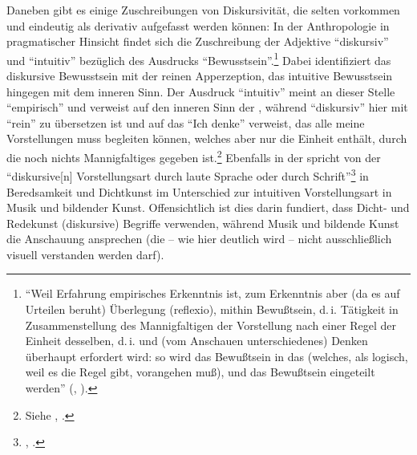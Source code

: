 Daneben gibt es einige Zuschreibungen von Diskursivität, die selten
vorkommen und eindeutig als derivativ aufgefasst werden können: In der
Anthropologie in pragmatischer Hinsicht findet sich die Zuschreibung der
Adjektive \enquote{diskursiv} und \enquote{intuitiv} bezüglich des
Ausdrucks \enquote{Bewusstsein}.\footnote{\enquote{Weil Erfahrung empirisches
Erkenntnis ist, zum Erkenntnis aber (da es auf Urteilen beruht) Überlegung
(reflexio), mithin Bewußtsein, d.\,i. Tätigkeit in Zusammenstellung des
Mannigfaltigen der Vorstellung nach einer Regel der Einheit desselben, d.\,i.
 und (vom Anschauen unterschiedenes) Denken überhaupt erfordert
wird: so wird das Bewußtsein in das  (welches, als logisch, weil
es die Regel gibt, vorangehen muß), und das  Bewußtsein
eingeteilt werden} \mkbibparens{\cite[][BA
27]{Kant:AnthropologieinpragmatischerHinsicht1977}, \cite[][VII:
141.21--27]{Kant:GesammelteWerke1900ff.}}.} Dabei identifiziert
 das diskursive Bewusstsein mit der reinen Apperzeption,
das intuitive Bewusstsein hingegen mit dem inneren Sinn. Der Ausdruck \enquote{intuitiv}
meint an dieser Stelle \enquote{empirisch} und verweist auf den inneren Sinn der
, während \enquote{diskursiv} hier mit
\enquote{rein} zu übersetzen ist und auf das \enquote{Ich denke} verweist, das
alle meine Vorstellungen muss begleiten können, welches aber nur die Einheit
enthält, durch die noch nichts Mannigfaltiges gegeben
ist.\footnote{Siehe \cite[][\S~16]{Kant:KritikderreinenVernunft2003},
\cite[][III: 108.16--110.35]{Kant:GesammelteWerke1900ff.}.} Ebenfalls in der
 spricht  von der \enquote{diskursive[n] Vorstellungsart
durch laute Sprache oder durch Schrift}\footnote{\cite[][BA
192]{Kant:AnthropologieinpragmatischerHinsicht1977}, \cite[][VII:
244.36--245.1]{Kant:GesammelteWerke1900ff.}.} in Beredsamkeit und Dichtkunst im
Unterschied zur intuitiven Vorstellungsart in Musik und bildender Kunst.
Offensichtlich ist dies darin fundiert, dass Dicht- und Redekunst
(diskursive) Begriffe verwenden, während Musik und bildende Kunst die Anschauung
ansprechen (die -- wie hier deutlich wird -- nicht ausschließlich visuell
verstanden werden darf).

